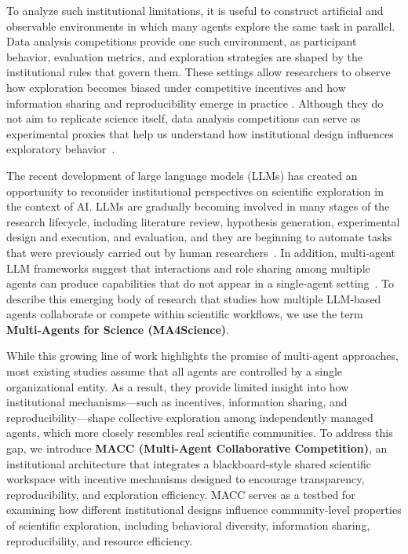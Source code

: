 \documentclass[sigconf]{aamas}
\begin{document}
To analyze such institutional limitations, it is useful to construct artificial and observable environments in which many agents explore the same task in parallel. Data analysis competitions provide one such environment, as participant behavior, evaluation metrics, and exploration strategies are shaped by the institutional rules that govern them. These settings allow researchers to observe how exploration becomes biased under competitive incentives and how information sharing and reproducibility emerge in practice \cite{Bonisch2025KaggleChronicles}. Although they do not aim to replicate science itself, data analysis competitions can serve as experimental proxies that help us understand how institutional design influences exploratory behavior~\cite{vazquez2005organizing}.

The recent development of large language models (LLMs) has created an opportunity to reconsider institutional perspectives on scientific exploration in the context of AI. 
LLMs are gradually becoming involved in many stages of the research lifecycle, including literature review, hypothesis generation, experimental design and execution, and evaluation, and they are beginning to automate tasks that were previously carried out by human researchers~\cite{Zheng2025LLMScienceSurvey, Luo2025LLM4SR, Zhang2024ScientificLLMs, lu2024aiscientist}. In addition, multi-agent LLM frameworks suggest that interactions and role sharing among multiple agents can produce capabilities that do not appear in a single-agent setting~\cite{Li2023CAMEL, baek2025researchagent, schmidgall2025agentlaboratory}.
To describe this emerging body of research that studies how multiple LLM-based agents collaborate or compete within scientific workflows, we use the term \textbf{Multi-Agents for Science (MA4Science)}.

While this growing line of work highlights the promise of multi-agent approaches, most existing studies assume that all agents are controlled by a single organizational entity. As a result, they provide limited insight into how institutional mechanisms—such as incentives, information sharing, and reproducibility—shape collective exploration among independently managed agents, which more closely resembles real scientific communities. To address this gap, we introduce \textbf{MACC (Multi-Agent Collaborative Competition)}, an institutional architecture that integrates a blackboard-style shared scientific workspace with incentive mechanisms designed to encourage transparency, reproducibility, and exploration efficiency. MACC serves as a testbed for examining how different institutional designs influence community-level properties of scientific exploration, including behavioral diversity, information sharing, reproducibility, and resource efficiency.
\end{document}
